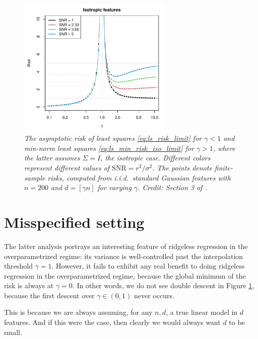 \documentclass{article}
\begin{document}
\begin{figure}[htb]
\centering
\includegraphics[width=0.65\textwidth]{risk_iso.pdf}
\caption{\it The asymptotic risk of least squares \eqref{eq:ls_risk_limit} for
  $\gamma<1$ and min-norm least squares \eqref{eq:ls_min_risk_iso_limit} for
  $\gamma>1$, where the latter assumes $\Sigma = I$, the isotropic
  case. Different colors represent different values of $\mathrm{SNR} = r^2 /
  \sigma^2$. The points denote finite-sample risks, computed from i.i.d.\
  standard Gaussian features with $n=200$ and $d=[\gamma n]$ for varying
  $\gamma$. Credit: Section 3 of \citet{hastie2022surprises}.}  
\label{fig:risk_iso}
\end{figure}

\section{Misspecified setting}

The latter analysis portrays an interesting feature of ridgeless regression in  
the overparametrized regime: its variance is well-controlled past the
interpolation threshold $\gamma = 1$. However, it fails to exhibit any real
benefit to doing ridgeless regression in the overparametrized regime, because
the global minimum of the risk is always at $\gamma = 0$. In other words, we 
do not see double descent in Figure \ref{fig:risk_iso}, because the first
descent over $\gamma \in (0,1)$ never occurs.  

This is because we are always assuming, for any $n,d$, a true linear model in
$d$ features. And if this were the case, then clearly we would always want $d$
to be small.
\end{document}
